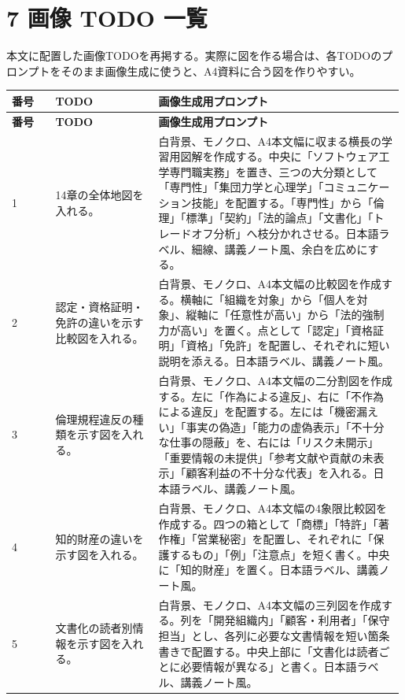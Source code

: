 \documentclass[uplatex,dvipdfmx,a4paper,11pt]{jsarticle}
\begin{document}
\section*{7 画像 TODO 一覧}


本文に配置した画像TODOを再掲する。実際に図を作る場合は、各TODOのプロンプトをそのまま画像生成に使うと、A4資料に合う図を作りやすい。

\begin{center}
\small
\begin{longtable}{p{0.11\linewidth}p{0.26\linewidth}p{0.62\linewidth}}
\toprule
\textbf{番号} & \textbf{TODO} & \textbf{画像生成用プロンプト} \\
\midrule
\endfirsthead
\toprule
\textbf{番号} & \textbf{TODO} & \textbf{画像生成用プロンプト} \\
\midrule
\endhead
1 & 14章の全体地図を入れる。 & 白背景、モノクロ、A4本文幅に収まる横長の学習用図解を作成する。中央に「ソフトウェア工学専門職実務」を置き、三つの大分類として「専門性」「集団力学と心理学」「コミュニケーション技能」を配置する。「専門性」から「倫理」「標準」「契約」「法的論点」「文書化」「トレードオフ分析」へ枝分かれさせる。日本語ラベル、細線、講義ノート風、余白を広めにする。 \\
\midrule
2 & 認定・資格証明・免許の違いを示す比較図を入れる。 & 白背景、モノクロ、A4本文幅の比較図を作成する。横軸に「組織を対象」から「個人を対象」、縦軸に「任意性が高い」から「法的強制力が高い」を置く。点として「認定」「資格証明」「資格」「免許」を配置し、それぞれに短い説明を添える。日本語ラベル、講義ノート風。 \\
\midrule
3 & 倫理規程違反の種類を示す図を入れる。 & 白背景、モノクロ、A4本文幅の二分割図を作成する。左に「作為による違反」、右に「不作為による違反」を配置する。左には「機密漏えい」「事実の偽造」「能力の虚偽表示」「不十分な仕事の隠蔽」を、右には「リスク未開示」「重要情報の未提供」「参考文献や貢献の未表示」「顧客利益の不十分な代表」を入れる。日本語ラベル、講義ノート風。 \\
\midrule
4 & 知的財産の違いを示す図を入れる。 & 白背景、モノクロ、A4本文幅の4象限比較図を作成する。四つの箱として「商標」「特許」「著作権」「営業秘密」を配置し、それぞれに「保護するもの」「例」「注意点」を短く書く。中央に「知的財産」を置く。日本語ラベル、講義ノート風。 \\
\midrule
5 & 文書化の読者別情報を示す図を入れる。 & 白背景、モノクロ、A4本文幅の三列図を作成する。列を「開発組織内」「顧客・利用者」「保守担当」とし、各列に必要な文書情報を短い箇条書きで配置する。中央上部に「文書化は読者ごとに必要情報が異なる」と書く。日本語ラベル、講義ノート風。 \\

\end{longtable}
\end{center}
\end{document}
